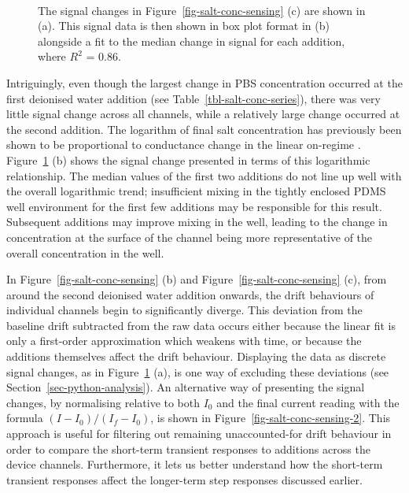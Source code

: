 \documentclass[
  a4paper,
]{scrbook}
\begin{document}
\begin{figure}
\begin{minipage}[t]{0.65\linewidth}
{{}

}

\end{minipage}%
%
\begin{minipage}[t]{0.17\linewidth}

{\centering 

~

}

\end{minipage}%

\caption[Signal changes from the previous figure, alongside a fit to the
median change in signal for each
addition.]{\label{fig-salt-conc-signal}The signal changes in
Figure~\ref{fig-salt-conc-sensing} (c) are shown in (a). This signal
data is then shown in box plot format in (b) alongside a fit to the
median change in signal for each addition, where \(R^2\) = 0.86.}

\end{figure}

Intriguingly, even though the largest change in PBS concentration
occurred at the first deionised water addition (see
Table~\ref{tbl-salt-conc-series}), there was very little signal change
across all channels, while a relatively large change occurred at the
second addition. The logarithm of final salt concentration has
previously been shown to be proportional to conductance change in the
linear on-regime \autocite{Heller2010}.
Figure~\ref{fig-salt-conc-signal} (b) shows the signal change presented
in terms of this logarithmic relationship. The median values of the
first two additions do not line up well with the overall logarithmic
trend; insufficient mixing in the tightly enclosed PDMS well environment
for the first few additions may be responsible for this result.
Subsequent additions may improve mixing in the well, leading to the
change in concentration at the surface of the channel being more
representative of the overall concentration in the well.

In Figure~\ref{fig-salt-conc-sensing} (b) and
Figure~\ref{fig-salt-conc-sensing} (c), from around the second deionised
water addition onwards, the drift behaviours of individual channels
begin to significantly diverge. This deviation from the baseline drift
subtracted from the raw data occurs either because the linear fit is
only a first-order approximation which weakens with time, or because the
additions themselves affect the drift behaviour. Displaying the data as
discrete signal changes, as in Figure~\ref{fig-salt-conc-signal} (a), is
one way of excluding these deviations (see
Section~\ref{sec-python-analysis}). An alternative way of presenting the
signal changes, by normalising relative to both \(I_{0}\) and the final
current reading with the formula \((I - I_{0})/(I_{f} - I_{0})\), is
shown in Figure~\ref{fig-salt-conc-sensing-2}. This approach is useful
for filtering out remaining unaccounted-for drift behaviour in order to
compare the short-term transient responses to additions across the
device channels. Furthermore, it lets us better understand how the
short-term transient responses affect the longer-term step responses
discussed earlier.
\end{document}
